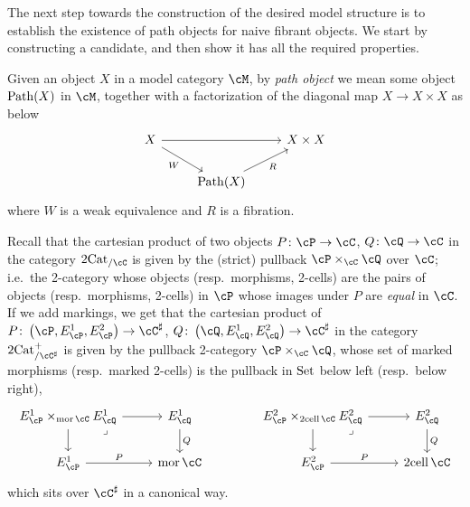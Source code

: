 \documentclass[11pt, dvipsnames]{amsart}
\begin{document}
	The next step towards the construction of the desired model structure is to establish the existence of path objects for naive fibrant objects. We start by constructing a candidate, and then show it has all the required properties.

    Given an object $X$ in a model category $\cM$, by \emph{path object} we mean some object $\mathrm{Path}(X)$ in $\cM$, together with a factorization of the diagonal map $X\to X\times X$ as below
    \[\begin{tikzcd}
        X\ar[rr]\ar[dr,"W"']  & & X\times X\\
        & \Path(X)\ar[ur,"R"']
    \end{tikzcd}\]
    where $W$ is a weak equivalence and $R$ is a fibration.

    \begin{rmk}
        Recall that the cartesian product of two objects $P\colon\cP\to\cC$, $Q\colon\cQ\to\cC$ in the category $\twocat_{/\cC}$ is given by the (strict) pullback $\cP\times_{\cC}\cQ$ over $\cC$; i.e.\ the 2-category whose objects (resp.\ morphisms, 2-cells) are the pairs of objects (resp.\ morphisms, 2-cells) in $\cP$ whose images under $P$ are \emph{equal} in $\cC$. If we add markings, we get that the cartesian product of $P\colon\markedscat{\cP}\to\Csharp$, $Q\colon\markedscat{\cQ}\to\Csharp$ in the category $\twocat^{+}_{/\Csharp}$ is given by the pullback 2-category $\cP\times_{\cC}\cQ$, whose set of marked morphisms (resp.\ marked 2-cells) is the pullback in $\mathrm{Set}$ below left (resp.\ below right),
        \[\begin{tikzcd}
		E^1_\cP\times_{\operatorname{mor}\cC} E^1_\cQ\dar\rar \drar["\lrcorner"{anchor=center, pos=0.125}, draw=none] & E^1_\cQ\dar["Q"]\\
        E^1_\cP\rar["P"] & \operatorname{mor}\cC
	\end{tikzcd}\qquad \qquad
    \begin{tikzcd}
		E^2_\cP\times_{\operatorname{2cell}\cC} E^2_\cQ\dar\rar \drar["\lrcorner"{anchor=center, pos=0.125}, draw=none] & E^2_\cQ\dar["Q"]\\
        E^2_\cP\rar["P"] & \operatorname{2cell}\cC
	\end{tikzcd}\]
    which sits over $\Csharp$ in a canonical way.
    \end{rmk}
\end{document}
